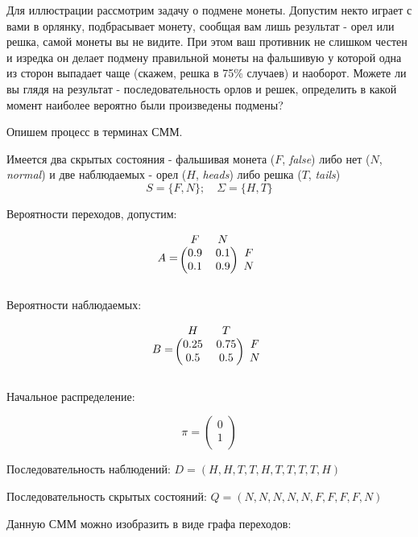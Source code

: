 \documentclass[letterpaper, 11pt]{article}
\begin{document}
Для иллюстрации рассмотрим задачу о подмене монеты. Допустим некто играет с вами в орлянку, подбрасывает монету, сообщая вам лишь результат - орел или решка, самой монеты вы не видите. При этом ваш противник не слишком честен и изредка он делает подмену правильной монеты на фальшивую у которой одна из сторон выпадает чаще (скажем, решка в 75\% случаев) и наоборот. Можете ли вы глядя на результат - последовательность орлов и решек, определить в какой момент наиболее вероятно были произведены подмены?

Опишем  процесс в терминах СММ.

Имеется два скрытых состояния - фальшивая монета ($F$, \textit{false}) либо нет ($N$, \textit{normal}) и две наблюдаемых - орел ($H$, \textit{heads}) либо решка ($T$, \textit{tails})
$$S=\{F,N\};\quad \Sigma=\{H,T\}$$

Вероятности переходов, допустим:

$$A=
\begin{blockarray}{ccc}
F & N \\
\begin{block}{(cc)c}
0.9 & 0.1 & F \\
0.1 & 0.9 & N \\
\end{block}
\end{blockarray}
$$

Вероятности наблюдаемых:

$$B=
\begin{blockarray}{ccc}
H & T \\
\begin{block}{(cc)c}
0.25 & 0.75 & F \\
0.5 & 0.5 & N \\
\end{block}
\end{blockarray}
$$

Начальное распределение:

$$\pi=
\begin{pmatrix}
0 \\
1 \\
\end{pmatrix}
$$

  
Последовательность наблюдений:
$D=(H,H,T,T,H,T,T,T,T,H)$

Последовательность скрытых состояний:
$Q=(N,N,N,N,N,F,F,F,F,N)$

Данную СММ можно изобразить в виде графа переходов:
\end{document}
